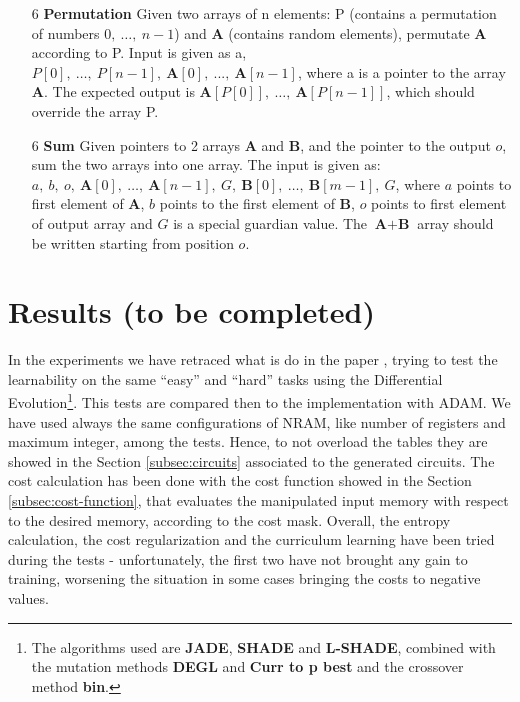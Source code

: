 \begin{itemize}
	\item[6]{\textbf{Permutation} Given two arrays of n elements: P (contains a permutation of numbers $0,\ \dots,\ n-1$) and \textbf{A} (contains random elements), permutate \textbf{A} according to P. Input is given as a, $P[0],\ \dots,\ P[n-1],\ \textbf{A}[0],\ ...,\ \textbf{A}[n-1]$, where a is a pointer to the array \textbf{A}. The expected output is $\textbf{A}[P[0]],\ \dots,\ \textbf{A}[P[n-1]]$, which should override the array P.}
	\item[6]{\textbf{Sum} Given pointers to 2 arrays \textbf{A} and \textbf{B}, and the pointer to the output $o$, sum the two arrays into one array. The input is given as: $a,\ b,\ o,\ \textbf{A}[0],\ \dots,\ \textbf{A}[n-1],\ G,\ \textbf{B}[0],\ \dots,\ \textbf{B}[m-1],\ G$, where $a$ points to first element of \textbf{A}, $b$ points to the first element of \textbf{B}, $o$ points to first element of output array and $G$ is a special guardian value. The $\textbf{A}+\textbf{B}$ array should be written starting from position $o$.}
\end{itemize}

\section{Results (to be completed)}
In the experiments we have retraced what is do in the paper \cite{NRAM:2016}, trying to test the learnability on the same ``easy'' and ``hard'' tasks using the Differential Evolution\footnote{The algorithms used are \textbf{JADE}, \textbf{SHADE} and \textbf{L-SHADE}, combined with the mutation methods \textbf{DEGL} and \textbf{Curr to p best} and the crossover method \textbf{bin}.}. This tests are compared then to the implementation with ADAM. We have used always the same configurations of NRAM, like number of registers and maximum integer, among the tests. Hence, to not overload the tables they are showed in the Section \ref{subsec:circuits} associated to the generated circuits. The cost calculation has been done with the cost function showed in the Section \ref{subsec:cost-function}, that evaluates the manipulated input memory with respect to the desired memory, according to the cost mask. Overall, the entropy calculation, the cost regularization and the curriculum learning have been tried during the tests - unfortunately, the first two have not brought any gain to training, worsening the situation in some cases bringing the costs to negative values.

